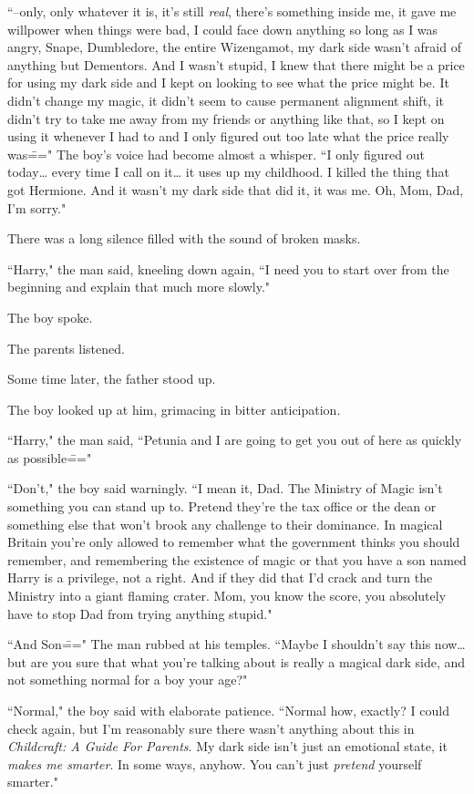 ``\---only, only whatever it is, it's still \emph{real}, there's something inside me, it gave me willpower when things were bad, I could face down anything so long as I was angry, Snape, Dumbledore, the entire Wizengamot, my dark side wasn't afraid of anything but Dementors. And I wasn't stupid, I knew that there might be a price for using my dark side and I kept on looking to see what the price might be. It didn't change my magic, it didn't seem to cause permanent alignment shift, it didn't try to take me away from my friends or anything like that, so I kept on using it whenever I had to and I only figured out too late what the price really was\===" The boy's voice had become almost a whisper. ``I only figured out today{\ldots} every time I call on it{\ldots} it uses up my childhood. I killed the thing that got Hermione. And it wasn't my dark side that did it, it was me. Oh, Mom, Dad, I'm sorry."

There was a long silence filled with the sound of broken masks.

``Harry," the man said, kneeling down again, ``I need you to start over from the beginning and explain that much more slowly."

The boy spoke.

The parents listened.

Some time later, the father stood up.

The boy looked up at him, grimacing in bitter anticipation.

``Harry," the man said, ``Petunia and I are going to get you out of here as quickly as possible\==="

``Don't," the boy said warningly. ``I mean it, Dad. The Ministry of Magic isn't something you can stand up to. Pretend they're the tax office or the dean or something else that won't brook any challenge to their dominance. In magical Britain you're only allowed to remember what the government thinks you should remember, and remembering the existence of magic or that you have a son named Harry is a privilege, not a right. And if they did that I'd crack and turn the Ministry into a giant flaming crater. Mom, you know the score, you absolutely have to stop Dad from trying anything stupid."

``And Son\===" The man rubbed at his temples. ``Maybe I shouldn't say this now{\ldots} but are you sure that what you're talking about is really a magical dark side, and not something normal for a boy your age?"

``Normal," the boy said with elaborate patience. ``Normal how, exactly? I could check again, but I'm reasonably sure there wasn't anything about this in \emph{Childcraft: A Guide For Parents}. My dark side isn't just an emotional state, it \emph{makes me smarter}. In some ways, anyhow. You can't just \emph{pretend} yourself smarter."

